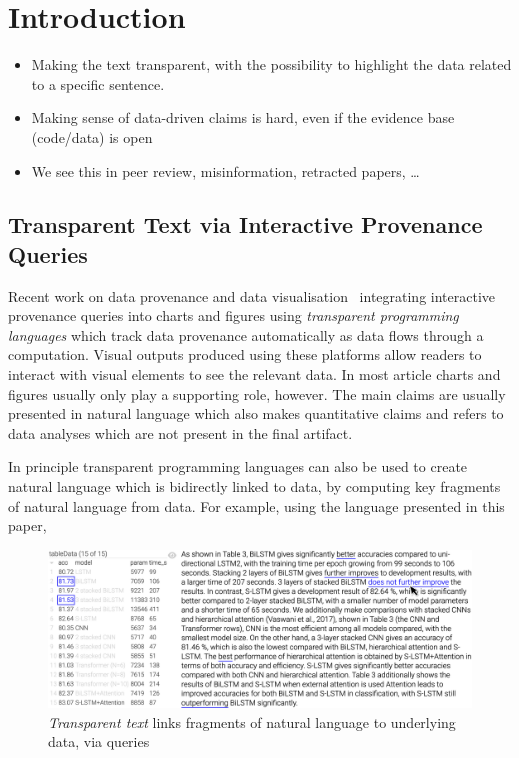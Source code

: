 \section{Introduction}

\lstset{
    aboveskip=-7pt,
    belowskip=-8.5pt,
    xleftmargin=0pt,
    xrightmargin=0pt
}

\begin{itemize}
    \item Making the text transparent, with the possibility to highlight the data related to a specific sentence.
    \item Making sense of data-driven claims is hard, even if the evidence base (code/data) is open
    \item We see this in peer review, misinformation, retracted papers, …
\end{itemize}

\subsection{Transparent Text via Interactive Provenance Queries}

Recent work on data provenance and data visualisation~\citep{psallidas18smoke,perera22,bond25} integrating
interactive provenance queries into charts and figures using \emph{transparent programming languages} which
track data provenance automatically as data flows through a computation. Visual outputs produced using these
platforms allow readers to interact with visual elements to see the relevant data. In most article charts and
figures usually only play a supporting role, however. The main claims are usually presented in natural
language which also makes quantitative claims and refers to data analyses which are not present in the final
artifact.

In principle transparent programming languages can also be used to create natural language which is bidirectly
linked to data, by computing key fragments of natural language from data. For example, using the language
presented in this paper,

\begin{figure}[h]
    \centering
    \includegraphics[width=\linewidth]{fig/scigen-1805.02474v1-10-with-pointer.png}
    \caption{\emph{Transparent text} links fragments of natural language to underlying data, via queries}\label{fig:scigen-example-website}
\end{figure}

